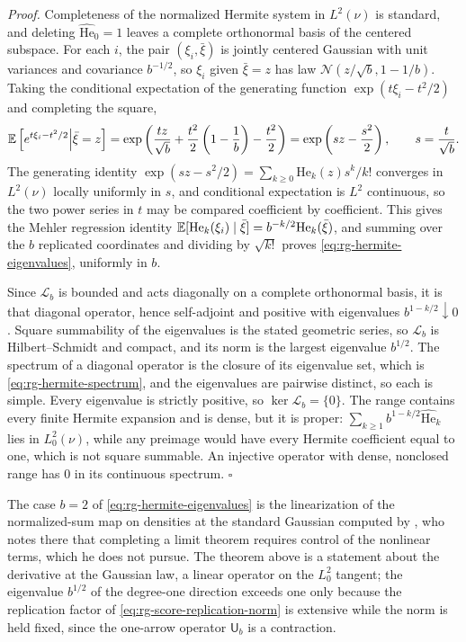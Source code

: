 \noindent\emph{Proof.}
Completeness of the normalized Hermite system in \(L^2(\nu)\) is standard, and deleting
\(\widehat{\mathrm{He}}_0=1\) leaves a complete orthonormal basis of the centered subspace. For each
\(i\), the pair \((\xi_i,\bar\xi)\) is jointly centered Gaussian with unit variances and
covariance \(b^{-1/2}\), so \(\xi_i\) given \(\bar\xi=z\) has law
\(\mathcal N(z/\sqrt b,1-1/b)\). Taking the conditional expectation of the generating
function \(\exp(t\xi_i-t^2/2)\) and completing the square,
\begin{equation}
\mathbb E\left[e^{t\xi_i-t^2/2}\middle|\bar\xi=z\right]
=\exp\left(\frac{tz}{\sqrt b}+\frac{t^2}2\left(1-\frac1b\right)-\frac{t^2}2\right)
=\exp\left(sz-\frac{s^2}2\right),
\qquad s=\frac t{\sqrt b}.
\label{eq:rg-mehler-generating}
\end{equation}
The generating identity \(\exp(sz-s^2/2)=\sum_{k\geq0}\mathrm{He}_k(z)s^k/k!\) converges in
\(L^2(\nu)\) locally uniformly in \(s\), and conditional expectation is \(L^2\)
continuous, so the two power series in \(t\) may be compared coefficient by
coefficient. This gives the Mehler regression identity
\(\mathbb E[\mathrm{He}_k(\xi_i)\mid\bar\xi]=b^{-k/2}\mathrm{He}_k(\bar\xi)\), and summing over the
\(b\) replicated coordinates and dividing by \(\sqrt{k!}\) proves
\eqref{eq:rg-hermite-eigenvalues}, uniformly in \(b\).

Since \(\mathscr L_b\) is bounded and acts diagonally on a complete orthonormal basis, it
is that diagonal operator, hence self-adjoint and positive with eigenvalues
\(b^{1-k/2}\downarrow0\). Square summability of the eigenvalues is the stated geometric
series, so \(\mathscr L_b\) is Hilbert--Schmidt and compact, and its norm is the largest
eigenvalue \(b^{1/2}\). The spectrum of a diagonal operator is the closure of its
eigenvalue set, which is \eqref{eq:rg-hermite-spectrum}, and the eigenvalues are pairwise
distinct, so each is simple. Every eigenvalue is strictly positive, so
\(\ker\mathscr L_b=\{0\}\). The range contains every finite Hermite expansion and is
dense, but it is proper: \(\sum_{k\geq1}b^{1-k/2}\widehat{\mathrm{He}}_k\) lies in \(L^2_0(\nu)\), while any
preimage would have every Hermite coefficient equal to one, which is not square
summable. An injective operator with dense, nonclosed range has \(0\) in its continuous
spectrum. \hfill$\square$

\medskip
The case \(b=2\) of \eqref{eq:rg-hermite-eigenvalues} is the linearization of the
normalized-sum map on densities at the standard Gaussian computed by
\citet[Sec.~2, Eq.~(2.14)]{JonaLasinio2001}, who notes there that completing a limit
theorem requires control of the nonlinear terms, which he does not pursue. The
theorem above is a statement about the derivative at the Gaussian law, a linear
operator on the \(L^2_0\) tangent; the eigenvalue \(b^{1/2}\) of the degree-one direction
exceeds one only because the replication factor of
\eqref{eq:rg-score-replication-norm} is extensive while the norm is held fixed, since
the one-arrow operator \(\mathsf U_b\) is a contraction.
